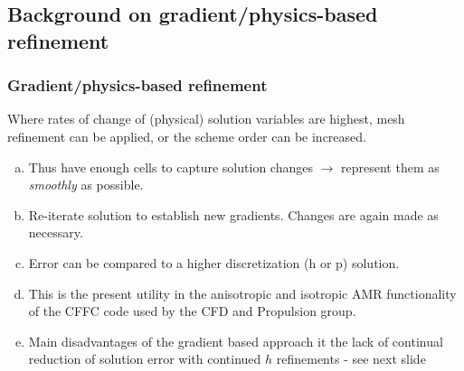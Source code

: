 \documentclass{beamer}
\begin{document}
\subsection[Gradient]{Background on gradient/physics-based refinement}
\begin{frame}%
\scriptsize
\frametitle{Gradient/physics-based refinement}
Where rates of change of (physical) solution variables are highest, mesh refinement can be applied, or the scheme order can be increased.

\begin{enumerate}[(a)]
\item Thus have enough cells to capture solution changes $\rightarrow$ represent them as \textit{smoothly} as possible.
\item Re-iterate solution to establish new gradients. Changes are again made as necessary. 
\item Error can be compared to a higher discretization (h or p) solution.
\item This is the present utility in the anisotropic and isotropic AMR functionality of the CFFC code used by the CFD and Propulsion group.
\item Main disadvantages of the gradient based approach it the lack of continual reduction of solution error with continued $h$ refinements - see next slide
\end{enumerate}
\end{frame}

\end{document}
